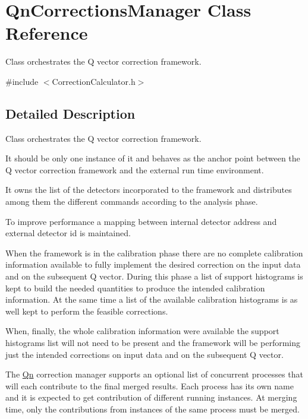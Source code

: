 \hypertarget{classQnCorrectionsManager}{}\section{Qn\+Corrections\+Manager Class Reference}
\label{classQnCorrectionsManager}


Class orchestrates the Q vector correction framework.  




{\ttfamily \#include $<$Correction\+Calculator.\+h$>$}



\subsection{Detailed Description}
Class orchestrates the Q vector correction framework. 

It should be only one instance of it and behaves as the anchor point between the Q vector correction framework and the external run time environment.

It owns the list of the detectors incorporated to the framework and distributes among them the different commands according to the analysis phase.

To improve performance a mapping between internal detector address and external detector id is maintained.

When the framework is in the calibration phase there are no complete calibration information available to fully implement the desired correction on the input data and on the subsequent Q vector. During this phase a list of support histograms is kept to build the needed quantities to produce the intended calibration information. At the same time a list of the available calibration histograms is as well kept to perform the feasible corrections.

When, finally, the whole calibration information were available the support histograms list will not need to be present and the framework will be performing just the intended corrections on input data and on the subsequent Q vector.

The \mbox{\hyperlink{namespaceQn}{Qn}} correction manager supports an optional list of concurrent processes that will each contribute to the final merged results. Each process has its own name and it is expected to get contribution of different running instances. At merging time, only the contributions from instances of the same process must be merged.

